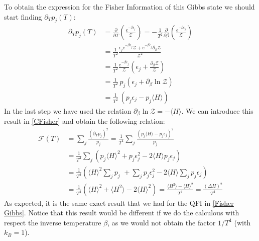 \hspace{-0.6 cm}To obtain the expression for the Fisher Information of this Gibbs state we should start finding $\partial_T p_j(T)$:
\begin{align}
    \partial_T p_j (T) &= \frac{\partial}{\partial T}(\frac{e^{-\beta\epsilon_j}}{\mathcal{Z}})=-\frac{1}{T^2} \frac{\partial}{\partial \beta}(\frac{e^{-\beta\epsilon_j}}{\mathcal{Z}})\\
    &= \frac{1}{T^2}\frac{\epsilon_je^{-\beta\epsilon_j}\mathcal{Z} + e^{-\beta\epsilon_j}\partial_\beta\mathcal{Z}}{\mathcal{Z}^2}\\
    &= \frac{1}{T^2}\frac{e^{-\beta e_j}}{\mathcal{Z}}(\epsilon_j+\frac{\partial_\beta\mathcal{Z}}{\mathcal{Z}})\\
    &=\frac{1}{T^2}\,p_j(\epsilon_j+\partial_\beta \ln{\mathcal{Z}})\\
    &=\frac{1}{T^2}\,(p_j\epsilon_j - p_j\langle H \rangle)
\end{align}
In the last step we have used the relation $\partial_\beta \ln{\mathcal{Z}} = -\langle H \rangle$. We can introduce this result in \eqref{CFisher} and obtain the following relation:
\begin{align}
    \mathcal{F}(T) &= \sum_j \frac{(\partial_T p_j)^2}{p_j} = \frac{1}{T^4}\sum_j \frac{(p_j\langle H \rangle - p_j\epsilon_j)^2}{p_j}\\
    &=\frac{1}{T^4}\sum_j\left( p_j\langle H \rangle^2 + p_j\epsilon_j^2 -2\langle H \rangle p_j\epsilon_j \right)\\
    &=\frac{1}{T^4}\left(\langle H \rangle^2\sum_j p_j\,\,+\sum_j p_j\epsilon_j^2 -2\langle H \rangle\sum_j p_j\epsilon_j\right)\\
    &=\frac{1}{T^4}\left(\langle H \rangle^2 +\langle H^2 \rangle - 2\langle H \rangle^2\right)=\frac{\langle H^2\rangle - \langle H \rangle^2}{T^4} = \frac{(\Delta H)^2}{T^4}
\end{align}
As expected, it is the same exact result that we had for the QFI in \eqref{Fisher Gibbs}. Notice that this result would be different if we do the calculous with respect the inverse temperature $\beta$, as we would not obtain the factor $1/T^4$ (with $k_B=1$).

